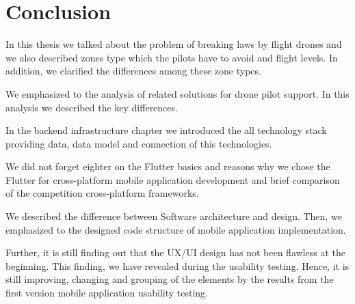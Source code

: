 \chapter{Conclusion}\label{ch:conclusion}
In this thesis we talked about the problem of breaking laws by flight drones and we also described zones type which the pilots have to avoid and flight levels.
In addition, we clarified the differences among these zone types. %

We emphasized to the analysis of related solutions for drone pilot support. %
In this analysis we described the key differences. %

In the backend infrastructure chapter we introduced the all technology stack providing data, data model and connection of this technologies. %

We did not forget eighter on the Flutter basics and reasons why we chose the Flutter for cross-platform mobile application development and brief comparison of the competition cross-platform frameworks.

We described the difference between Software architecture and design.
Then, we emphasized to the designed code structure of mobile application implementation.

Further, it is still finding out that the UX/UI design has not been flawless at the beginning. %
This finding, we have revealed during the usability testing. %
Hence, it is still improving, changing and grouping of the elements by the results from the first version mobile application usability testing. %

